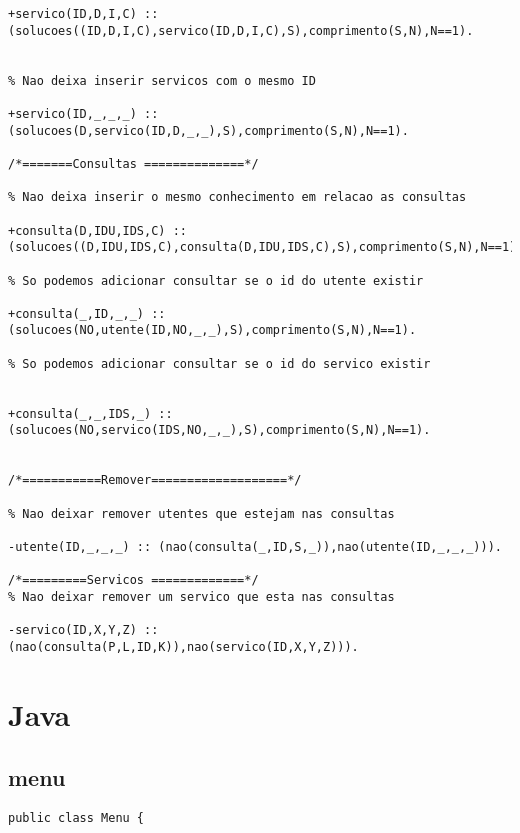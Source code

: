 \documentclass[pdftex,12pt,a4paper]{report}
\begin{document}
\begin{appendices}
\begin{verbatim}
+servico(ID,D,I,C) :: 
(solucoes((ID,D,I,C),servico(ID,D,I,C),S),comprimento(S,N),N==1).


% Nao deixa inserir servicos com o mesmo ID

+servico(ID,_,_,_) :: 
(solucoes(D,servico(ID,D,_,_),S),comprimento(S,N),N==1).

/*=======Consultas ==============*/ 

% Nao deixa inserir o mesmo conhecimento em relacao as consultas

+consulta(D,IDU,IDS,C) ::
(solucoes((D,IDU,IDS,C),consulta(D,IDU,IDS,C),S),comprimento(S,N),N==1).

% So podemos adicionar consultar se o id do utente existir 

+consulta(_,ID,_,_) ::
(solucoes(NO,utente(ID,NO,_,_),S),comprimento(S,N),N==1).

% So podemos adicionar consultar se o id do servico existir


+consulta(_,_,IDS,_) :: 
(solucoes(NO,servico(IDS,NO,_,_),S),comprimento(S,N),N==1).


/*===========Remover===================*/

% Nao deixar remover utentes que estejam nas consultas

-utente(ID,_,_,_) :: (nao(consulta(_,ID,S,_)),nao(utente(ID,_,_,_))).

/*=========Servicos =============*/
% Nao deixar remover um servico que esta nas consultas 

-servico(ID,X,Y,Z) :: (nao(consulta(P,L,ID,K)),nao(servico(ID,X,Y,Z))).

\end{verbatim}

\section{Java}
\subsection{menu}
\begin{verbatim}
public class Menu {


\end{verbatim}
\end{appendices}
\end{document}
